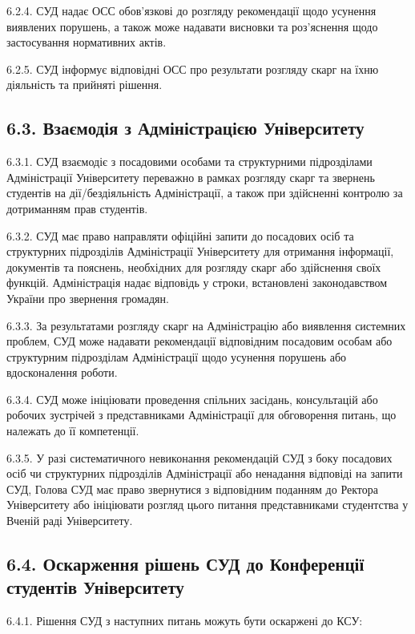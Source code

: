     6.2.4. СУД надає ОСС обов'язкові до розгляду рекомендації щодо усунення виявлених порушень, а також може надавати висновки та роз'яснення щодо застосування нормативних актів.

    6.2.5. СУД інформує відповідні ОСС про результати розгляду скарг на їхню діяльність та прийняті рішення.

\subsection*{6.3. Взаємодія з Адміністрацією Університету}
    6.3.1. СУД взаємодіє з посадовими особами та структурними підрозділами Адміністрації Університету переважно в рамках розгляду скарг та звернень студентів на дії/бездіяльність Адміністрації, а також при здійсненні контролю за дотриманням прав студентів.

    6.3.2. СУД має право направляти офіційні запити до посадових осіб та структурних підрозділів Адміністрації Університету для отримання інформації, документів та пояснень, необхідних для розгляду скарг або здійснення своїх функцій. Адміністрація надає відповідь у строки, встановлені законодавством України про звернення громадян.

    6.3.3. За результатами розгляду скарг на Адміністрацію або виявлення системних проблем, СУД може надавати рекомендації відповідним посадовим особам або структурним підрозділам Адміністрації щодо усунення порушень або вдосконалення роботи.

    6.3.4. СУД може ініціювати проведення спільних засідань, консультацій або робочих зустрічей з представниками Адміністрації для обговорення питань, що належать до її компетенції.

    6.3.5. У разі систематичного невиконання рекомендацій СУД з боку посадових осіб чи структурних підрозділів Адміністрації або ненадання відповіді на запити СУД, Голова СУД має право звернутися з відповідним поданням до Ректора Університету або ініціювати розгляд цього питання представниками студентства у Вченій раді Університету.

\subsection*{6.4. Оскарження рішень СУД до Конференції студентів Університету}
    6.4.1. Рішення СУД з наступних питань можуть бути оскаржені до КСУ:

